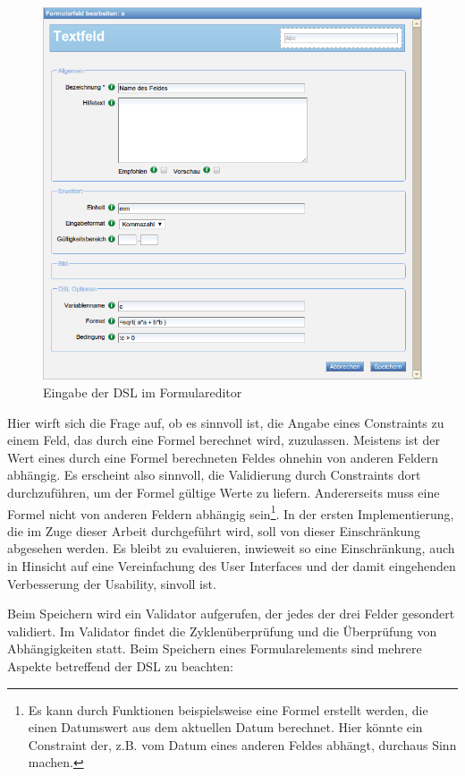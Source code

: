 \begin{figure}[h]
\includegraphics[scale=0.5]{figures/screenshot_spics_eingabe}
\caption{Eingabe der DSL im Formulareditor}
\label{abb_screenshot_spics_eingabe}
\end{figure}

Hier wirft sich die Frage auf, ob es sinnvoll ist, die Angabe eines Constraints zu einem Feld, das durch eine Formel berechnet wird, zuzulassen. Meistens ist der Wert eines durch eine Formel berechneten Feldes ohnehin von anderen Feldern abhängig. Es erscheint also sinnvoll, die Validierung durch Constraints dort durchzuführen, um der Formel gültige Werte zu liefern. Andererseits muss eine Formel nicht von anderen Feldern abhängig sein\footnote{{Es kann durch Funktionen beispielsweise eine Formel erstellt werden, die einen Datumswert aus dem aktuellen Datum berechnet. Hier könnte ein Constraint der, z.B. vom Datum eines anderen Feldes abhängt, durchaus Sinn machen.}}. In der ersten Implementierung, die im Zuge dieser Arbeit durchgeführt wird, soll von dieser Einschränkung abgesehen werden. Es bleibt zu evaluieren, inwieweit so eine Einschränkung, auch in Hinsicht auf eine Vereinfachung des User Interfaces und der damit eingehenden Verbesserung der Usability, sinvoll ist.

Beim Speichern wird ein Validator aufgerufen, der jedes der drei Felder gesondert validiert. Im Validator findet die Zyklenüberprüfung und die Überprüfung von Abhängigkeiten statt. Beim Speichern eines Formularelements sind mehrere Aspekte betreffend der DSL zu beachten:

